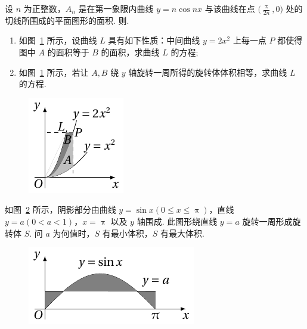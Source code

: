 	\begin{ti}
		设 $n$ 为正整数，$A_{n}$ 是在第一象限内曲线 $y = n \cos nx$ 与该曲线在点 $\bigl( \frac{\uppi}{2n},0 \bigr)$ 处的切线所围成的平面图形的面积. 则\kuo.

	\end{ti}

	\begin{ti}
		\begin{enumerate}
			\item 如图~\ref{fig:1.3.1} 所示，设曲线 $L$ 具有如下性质：中间曲线 $y = 2x^{2}$ 上每一点 $P$ 都使得图中 $A$ 的面积等于 $B$ 的面积，求曲线 $L$ 的方程;
			\item 如图~\ref{fig:1.3.1} 所示，若让 $A,B$ 绕 $y$ 轴旋转一周所得的旋转体体积相等，求曲线 $L$ 的方程.
		\end{enumerate}
		\begin{figure}[htbp]
			\centering
			\includegraphics[scale=1]{figure/fig1-3-1.pdf}
			\caption{}\label{fig:1.3.1}
		\end{figure}
	\end{ti}

	\begin{ti}
		如图~\ref{fig:1.3.2} 所示，阴影部分由曲线 $y = \sin x(0 \leq x \leq \uppi)$，直线 $y = a(0 < a < 1)$，$x = \uppi$ 以及 $y$ 轴围成. 此图形绕直线 $y = a$ 旋转一周形成旋转体 $S$. 问 $a$ 为何值时，$S$ 有最小体积，$S$ 有最大体积.
		\begin{figure}[htbp]
			\centering
			\includegraphics[scale=1]{figure/fig1-3-2.pdf}
			\caption{}\label{fig:1.3.2}
		\end{figure}
	\end{ti}

